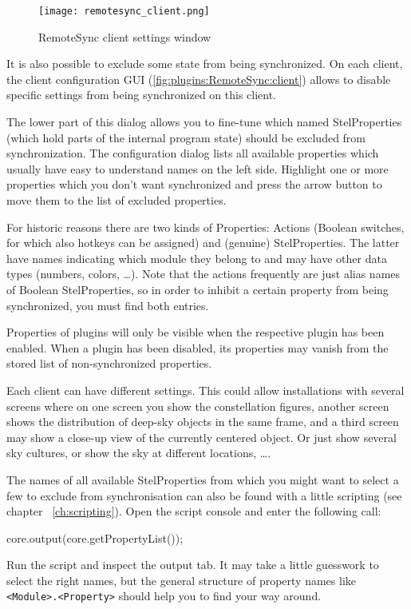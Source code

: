 \begin{figure}[ht]
	\centering\texttt{[image: remotesync\_client.png]}
	\caption{RemoteSync client settings window}
	\label{fig:plugins:RemoteSync:client}
\end{figure}

It is also possible to exclude some state from being synchronized. On each
client, the client configuration GUI (\autoref{fig:plugins:RemoteSync:client}) allows to
disable specific settings from being synchronized on this client. 

The lower part of this dialog allows you to 
fine-tune which named StelProperties (which hold parts of the internal program state) 
should be excluded from synchronization. 
The configuration dialog lists all available properties which usually have easy to understand 
names on the left side. Highlight one or more properties which you don't want synchronized 
and press the arrow button to move them to the list of excluded properties.

For historic reasons there are two kinds of Properties: Actions 
(Boolean switches, for which also hotkeys can be assigned) and (genuine) StelProperties. 
The latter have names indicating which module they belong to and may have other data types (numbers, colors, \ldots). 
Note that the actions frequently are just alias names of Boolean StelProperties, 
so in order to inhibit a certain property from being synchronized, you must find both entries.

Properties of plugins will only be visible when the respective plugin has been enabled. 
When a plugin has been disabled, its properties may vanish from the stored list of non-synchronized properties.

Each client can have different settings. This could allow installations with several screens
where on one screen you show the constellation figures, another screen shows the
distribution of deep-sky objects in the same frame, and a third screen may show
a close-up view of the currently centered object. Or just show several sky cultures, 
or show the sky at different locations, \ldots. 

The names of all available StelProperties from which you might want to select a few to exclude  
from synchronisation can also be found with a little scripting (see chapter ~\ref{ch:scripting}). 
Open the script console  and enter the following call:
\begin{script}
core.output(core.getPropertyList());
\end{script}
Run the script and inspect the output tab. It may take a little guesswork to select the right names, 
but the general structure of property names like 
\texttt{<Module>.<Property>} should help you to find your way around.


